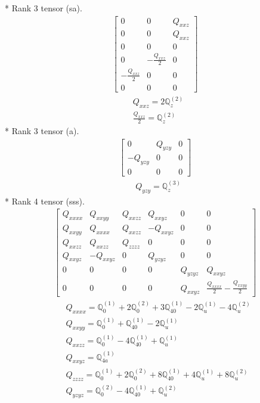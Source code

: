 \documentclass[fleqn,8pt,landscape]{jsarticle}
\begin{document}
* Rank 3 tensor (sa).
\begin{align*}
\begin{bmatrix} 0 & 0 & Q_{xxz} \\ 0 & 0 & Q_{xxz} \\ 0 & 0 & 0 \\ 0 & - \frac{Q_{xxz}}{2} & 0 \\ - \frac{Q_{xxz}}{2} & 0 & 0 \\ 0 & 0 & 0 \end{bmatrix}
\end{align*}
\begin{align*}
& Q_{xxz} = 2 \mathbb{Q}_{z}^{(2)} \\
& \frac{Q_{xxz}}{2} = \mathbb{Q}_{z}^{(2)}
\end{align*}
* Rank 3 tensor (a).
\begin{align*}
\begin{bmatrix} 0 & Q_{yzy} & 0 \\ - Q_{yzy} & 0 & 0 \\ 0 & 0 & 0 \end{bmatrix}
\end{align*}
\begin{align*}
& Q_{yzy} = \mathbb{Q}_{z}^{(3)}
\end{align*}
* Rank 4 tensor (sss).
\begin{align*}
\begin{bmatrix} Q_{xxxx} & Q_{xxyy} & Q_{xxzz} & Q_{xxyz} & 0 & 0 \\ Q_{xxyy} & Q_{xxxx} & Q_{xxzz} & - Q_{xxyz} & 0 & 0 \\ Q_{xxzz} & Q_{xxzz} & Q_{zzzz} & 0 & 0 & 0 \\ Q_{xxyz} & - Q_{xxyz} & 0 & Q_{yzyz} & 0 & 0 \\ 0 & 0 & 0 & 0 & Q_{yzyz} & Q_{xxyz} \\ 0 & 0 & 0 & 0 & Q_{xxyz} & \frac{Q_{xxxx}}{2} - \frac{Q_{xxyy}}{2} \end{bmatrix}
\end{align*}
\begin{align*}
& Q_{xxxx} = \mathbb{Q}_{0}^{(1)} + 2 \mathbb{Q}_{0}^{(2)} + 3 \mathbb{Q}_{40}^{(1)} - 2 \mathbb{Q}_{u}^{(1)} - 4 \mathbb{Q}_{u}^{(2)} \\
& Q_{xxyy} = \mathbb{Q}_{0}^{(1)} + \mathbb{Q}_{40}^{(1)} - 2 \mathbb{Q}_{u}^{(1)} \\
& Q_{xxzz} = \mathbb{Q}_{0}^{(1)} - 4 \mathbb{Q}_{40}^{(1)} + \mathbb{Q}_{u}^{(1)} \\
& Q_{xxyz} = \mathbb{Q}_{4a}^{(1)} \\
& Q_{zzzz} = \mathbb{Q}_{0}^{(1)} + 2 \mathbb{Q}_{0}^{(2)} + 8 \mathbb{Q}_{40}^{(1)} + 4 \mathbb{Q}_{u}^{(1)} + 8 \mathbb{Q}_{u}^{(2)} \\
& Q_{yzyz} = \mathbb{Q}_{0}^{(2)} - 4 \mathbb{Q}_{40}^{(1)} + \mathbb{Q}_{u}^{(2)}
\end{align*}
\end{document}
